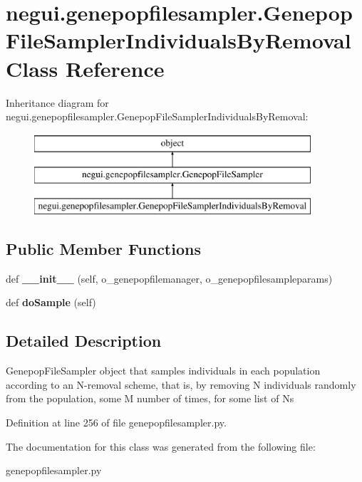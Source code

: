 \hypertarget{classnegui_1_1genepopfilesampler_1_1GenepopFileSamplerIndividualsByRemoval}{}\section{negui.\+genepopfilesampler.\+Genepop\+File\+Sampler\+Individuals\+By\+Removal Class Reference}
\label{classnegui_1_1genepopfilesampler_1_1GenepopFileSamplerIndividualsByRemoval}
Inheritance diagram for negui.\+genepopfilesampler.\+Genepop\+File\+Sampler\+Individuals\+By\+Removal\+:\begin{figure}[H]
\begin{center}
\leavevmode
\includegraphics[height=3.000000cm]{classnegui_1_1genepopfilesampler_1_1GenepopFileSamplerIndividualsByRemoval}
\end{center}
\end{figure}
\subsection*{Public Member Functions}
\begin{DoxyCompactItemize}
\item 
def {\bfseries \+\_\+\+\_\+init\+\_\+\+\_\+} (self, o\+\_\+genepopfilemanager, o\+\_\+genepopfilesampleparams)\hypertarget{classnegui_1_1genepopfilesampler_1_1GenepopFileSamplerIndividualsByRemoval_aeba1258d811dd266cb3378212a4a1926}{}\label{classnegui_1_1genepopfilesampler_1_1GenepopFileSamplerIndividualsByRemoval_aeba1258d811dd266cb3378212a4a1926}

\item 
def {\bfseries do\+Sample} (self)\hypertarget{classnegui_1_1genepopfilesampler_1_1GenepopFileSamplerIndividualsByRemoval_a89dd3d276b9f089ac4c46dd844e7a848}{}\label{classnegui_1_1genepopfilesampler_1_1GenepopFileSamplerIndividualsByRemoval_a89dd3d276b9f089ac4c46dd844e7a848}

\end{DoxyCompactItemize}


\subsection{Detailed Description}
\begin{DoxyVerb}GenepopFileSampler object that samples individuals in each population
according to an N-removal scheme, that is, by removing N individuals 
randomly from the population, some M number of times, for some list of Ns
\end{DoxyVerb}
 

Definition at line 256 of file genepopfilesampler.\+py.



The documentation for this class was generated from the following file\+:\begin{DoxyCompactItemize}
\item 
genepopfilesampler.\+py\end{DoxyCompactItemize}
